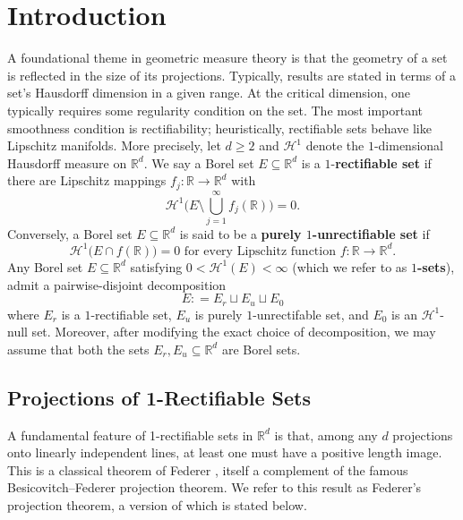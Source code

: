 \documentclass[12pt]{amsart}
\theoremstyle{definition}
\numberwithin{equation}{section}
\newcommand{\R}{\mathbb{R}}
\begin{document}
\maketitle


\section{Introduction}

A foundational theme in geometric measure theory is that the geometry of a set is reflected in the size of its projections.
Typically, results are stated in terms of a set's Hausdorff dimension in a given range. At the critical dimension, one typically requires some regularity condition on the set. The most important smoothness condition is rectifiability; heuristically, rectifiable sets behave like Lipschitz manifolds. More precisely, let $d \geq 2$ and $\mathcal{H}^1$ denote the $1$-dimensional Hausdorff measure on $\mathbb{R}^d$. We say a Borel set $E \subseteq \mathbb{R}^d$ is a $1$-\textbf{rectifiable set} if there are Lipschitz mappings $f_j : \mathbb{R} \rightarrow \mathbb{R}^d$ with
$$
\mathcal{H}^1 \bigg(  E \setminus \bigcup_{j = 1}^{\infty} f_j (\mathbb{R})\bigg) = 0.
$$
Conversely, a Borel set $E \subseteq \mathbb{R}^d$ is said to be a \textbf{purely $1$-unrectifiable set} if
$$
\mathcal{H}^1 \big(E \cap f (\mathbb{R})\big) = 0 \textrm{ for every Lipschitz function } f : \mathbb{R} \rightarrow \mathbb{R}^d.
$$
Any Borel set $E \subseteq \mathbb{R}^d$  satisfying $0 < \mathcal{H}^1 (E) < \infty$ (which we refer to as \textbf{$1$-sets}), admit a pairwise-disjoint decomposition
\begin{equation}\label{eq:1setdecomposition}
E : = E_{r} \sqcup E_{u} \sqcup E_{0}
\end{equation}
where $E_r$ is a $1$-rectifiable set, $E_u$ is purely $1$-unrectifable set, and $E_0$ is an $\mathcal{H}^1$-null set. Moreover, after modifying the exact choice of decomposition, we may assume that both the sets $E_r,E_u \subseteq \mathbb{R}^d$ are Borel sets.

\subsection{Projections of 1-Rectifiable Sets}

A fundamental feature of 1-rectifiable sets in $\R^d$ is that, among any $d$ projections onto linearly independent lines, at least one must have a positive length image. 
This is a classical theorem of Federer \cite[Theorem 3.2.27]{Federer1996}, itself a complement of the famous Besicovitch--Federer projection theorem. We refer to this result as Federer's projection theorem, a version of which is stated below.
\end{document}
